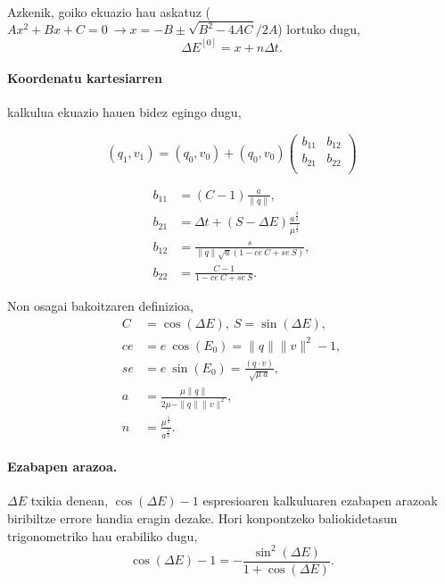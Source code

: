 \paragraph*{} Azkenik, goiko ekuazio hau askatuz ($Ax^2+Bx+C=0 \ \rightarrow x={-B\pm \sqrt{B^2-4AC}}/{2A}$) lortuko dugu,
\begin{equation*}
\Delta E^{[0]}=x+n\Delta t.
\end{equation*}

\paragraph*{Koordenatu kartesiarren} kalkulua ekuazio hauen bidez egingo dugu,

\begin{equation*}
(q_1,v_1)=(q_0,v_0)+ (q_0,v_0) \left(\begin{array}{cc}
                                       b_{11} & b_{12} \\
                                       b_{21} & b_{22} \\
                                \end{array}\right)
\end{equation*}

\begin{align*}
b_{11} &=(C-1) \frac{a}{\|q\|}, \\
b_{21} &=\Delta t+(S-\Delta E) \frac{a^{\frac{3}{2}}}{\mu^{\frac{1}{2}}} \\
b_{12} &=\frac{s}{\|q\| \sqrt{a} (1-ce \ C +se \ S)}, \\
b_{22} &=\frac{C-1}{1-ce \ C+ se \ S}. 
\end{align*}

Non osagai bakoitzaren definizioa,
\begin{align*}
C &=\cos(\Delta E), \ S=\sin(\Delta E), \\
ce &=e \ \cos(E_0) = \|q\| \|v\|^2-1, \\
se &= e \ \sin(E_0)=\frac{(q \cdot v)}{\sqrt{\mu \ a}}, \\
a &= \frac{\mu \|q\|}{2\mu-\|q\|\|v\|^2}, \\
n &= \frac{\mu^{\frac{1}{2}}}{a^{\frac{3}{2}}}.
\end{align*}

\paragraph*{Ezabapen arazoa.} $\Delta E$ txikia denean, $\cos(\Delta E)-1$ espresioaren kalkuluaren ezabapen arazoak biribiltze errore handia eragin dezake. Hori konpontzeko baliokidetasun trigonometriko hau erabiliko dugu,
\begin{equation*}
\cos(\Delta E)-1=-\frac{\sin^2(\Delta E)}{1+\cos(\Delta E)}.
\end{equation*}  

